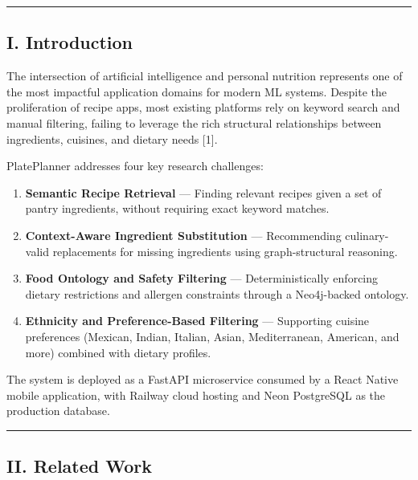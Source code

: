 \documentclass[
  10pt,
]{article}
\providecommand{\tightlist}{%
  \setlength{\itemsep}{0pt}\setlength{\parskip}{0pt}}
\begin{document}
\begin{center}\rule{0.5\linewidth}{0.5pt}\end{center}

\subsection{I. Introduction}\label{i.-introduction}

The intersection of artificial intelligence and personal nutrition
represents one of the most impactful application domains for modern ML
systems. Despite the proliferation of recipe apps, most existing
platforms rely on keyword search and manual filtering, failing to
leverage the rich structural relationships between ingredients,
cuisines, and dietary needs {[}1{]}.

PlatePlanner addresses four key research challenges:

\begin{enumerate}
\def\labelenumi{\arabic{enumi}.}
\tightlist
\item
  \textbf{Semantic Recipe Retrieval} --- Finding relevant recipes given
  a set of pantry ingredients, without requiring exact keyword matches.
\item
  \textbf{Context-Aware Ingredient Substitution} --- Recommending
  culinary-valid replacements for missing ingredients using
  graph-structural reasoning.
\item
  \textbf{Food Ontology and Safety Filtering} --- Deterministically
  enforcing dietary restrictions and allergen constraints through a
  Neo4j-backed ontology.
\item
  \textbf{Ethnicity and Preference-Based Filtering} --- Supporting
  cuisine preferences (Mexican, Indian, Italian, Asian, Mediterranean,
  American, and more) combined with dietary profiles.
\end{enumerate}

The system is deployed as a FastAPI microservice consumed by a React
Native mobile application, with Railway cloud hosting and Neon
PostgreSQL as the production database.

\begin{center}\rule{0.5\linewidth}{0.5pt}\end{center}

\subsection{II. Related Work}\label{ii.-related-work}
\end{document}
